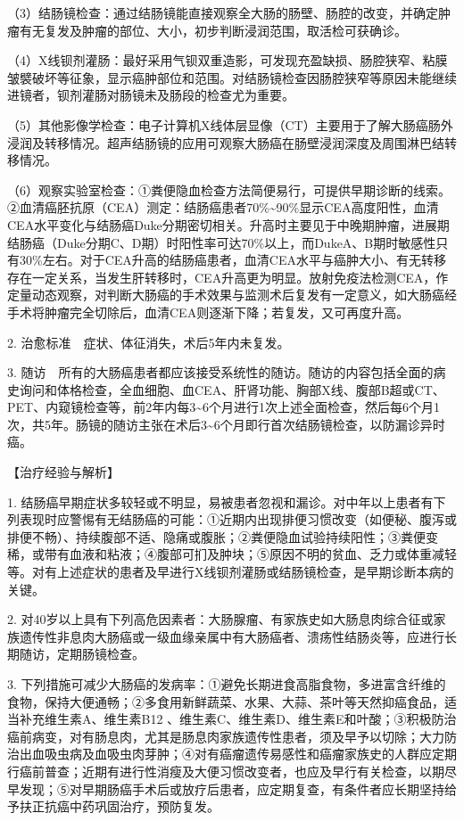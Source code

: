 （3）结肠镜检查：通过结肠镜能直接观察全大肠的肠壁、肠腔的改变，并确定肿瘤有无复发及肿瘤的部位、大小，初步判断浸润范围，取活检可获确诊。

（4）X线钡剂灌肠：最好采用气钡双重造影，可发现充盈缺损、肠腔狭窄、粘膜皱襞破坏等征象，显示癌肿部位和范围。对结肠镜检查因肠腔狭窄等原因未能继续进镜者，钡剂灌肠对肠镜未及肠段的检查尤为重要。

（5）其他影像学检查：电子计算机X线体层显像（CT）主要用于了解大肠癌肠外浸润及转移情况。超声结肠镜的应用可观察大肠癌在肠壁浸润深度及周围淋巴结转移情况。

（6）观察实验室检查：①粪便隐血检查方法简便易行，可提供早期诊断的线索。②血清癌胚抗原（CEA）测定：结肠癌患者70\%\textasciitilde{}90\%显示CEA高度阳性，血清CEA水平变化与结肠癌Duke分期密切相关。升高时主要见于中晚期肿瘤，进展期结肠癌（Duke分期C、D期）时阳性率可达70\%以上，而DukeA、B期时敏感性只有30\%左右。对于CEA升高的结肠癌患者，血清CEA水平与癌肿大小、有无转移存在一定关系，当发生肝转移时，CEA升高更为明显。放射免疫法检测CEA，作定量动态观察，对判断大肠癌的手术效果与监测术后复发有一定意义，如大肠癌经手术将肿瘤完全切除后，血清CEA则逐渐下降；若复发，又可再度升高。

2. 治愈标准　症状、体征消失，术后5年内未复发。

3.
随访　所有的大肠癌患者都应该接受系统性的随访。随访的内容包括全面的病史询问和体格检查，全血细胞、血CEA、肝肾功能、胸部X线、腹部B超或CT、PET、内窥镜检查等，前2年内每3\textasciitilde{}6个月进行1次上述全面检查，然后每6个月1次，共5年。肠镜的随访主张在术后3\textasciitilde{}6个月即行首次结肠镜检查，以防漏诊异时癌。

【治疗经验与解析】

1.
结肠癌早期症状多较轻或不明显，易被患者忽视和漏诊。对中年以上患者有下列表现时应警惕有无结肠癌的可能：①近期内出现排便习惯改变（如便秘、腹泻或排便不畅）、持续腹部不适、隐痛或腹胀；②粪便隐血试验持续阳性；③粪便变稀，或带有血液和粘液；④腹部可扪及肿块；⑤原因不明的贫血、乏力或体重减轻等。对有上述症状的患者及早进行X线钡剂灌肠或结肠镜检查，是早期诊断本病的关键。

2.
对40岁以上具有下列高危因素者：大肠腺瘤、有家族史如大肠息肉综合征或家族遗传性非息肉大肠癌或一级血缘亲属中有大肠癌者、溃疡性结肠炎等，应进行长期随访，定期肠镜检查。

3.
下列措施可减少大肠癌的发病率：①避免长期进食高脂食物，多进富含纤维的食物，保持大便通畅；②多食用新鲜蔬菜、水果、大蒜、茶叶等天然抑癌食品，适当补充维生素A、维生素B{12}
、维生素C、维生素D、维生素E和叶酸；③积极防治癌前病变，对有肠息肉，尤其是肠息肉家族遗传性患者，须及早予以切除；大力防治出血吸虫病及血吸虫肉芽肿；④对有癌瘤遗传易感性和癌瘤家族史的人群应定期行癌前普查；近期有进行性消瘦及大便习惯改变者，也应及早行有关检查，以期尽早发现；⑤对早期肠癌手术后或放疗后患者，应定期复查，有条件者应长期坚持给予扶正抗癌中药巩固治疗，预防复发。

